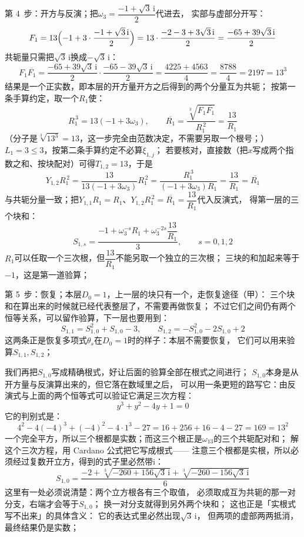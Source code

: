 \documentclass[UTF8,a4paper,11pt]{ctexart}
\newcommand{\ii}{\mathrm{i}}
\begin{document}
第 4~步：开方与反演；把$\omega_3=\dfrac{-1+\sqrt3\,\ii}{2}$代进去，
实部与虚部分开写：
\[
 F_1=13\Bigl(-1+3\cdot\frac{-1+\sqrt3\,\ii}{2}\Bigr)
 =13\cdot\frac{-2-3+3\sqrt3\,\ii}{2}
 =\frac{-65+39\sqrt3\,\ii}{2}
\]
共轭量只需把$\sqrt3\,\ii$换成$-\sqrt3\,\ii$：
\[
 F_1\overline{F_1}
 =\frac{-65+39\sqrt3\,\ii}{2}\cdot\frac{-65-39\sqrt3\,\ii}{2}
 =\frac{4225+4563}{4}=\frac{8788}{4}=2197=13^3
\]
结果是一个正实数，即本层的开方量开方之后得到的两个分量互为共轭；
按第一条手算约定，取一个$R_1$使：
\[
 R_1^{\,3}=13(-1+3\omega_3),\qquad
 \overline{R_1}=\frac{\sqrt[3]{F_1\overline{F_1}}}{R_1^{\,2}}
 =\frac{13}{R_1}
\]
（分子是$\sqrt[3]{13^3}=13$，这一步完全由范数决定，不需要另取一个根号；）
$L_1=3\le3$，按第二条手算约定不必算$\xi_{1,j}$；
若要核对，直接数（把$x$写成两个指数之和、按块配对）可得$T_{1,2}=13$，于是
\[
 Y_{1,2}R_1^{\,2}=\frac{13}{13(-1+3\omega_3)}R_1^{\,2}
 =\frac{R_1^{\,3}}{(-1+3\omega_3)R_1}
 =\frac{13}{R_1}=\overline{R_1}
\]
与共轭分量一致；把$Y_{1,1}R_1=R_1$、$Y_{1,2}R_1^{\,2}=\overline{R_1}=\dfrac{13}{R_1}$代入反演式，
得第一层的三个块和：
\[
 S_{1,s}=\frac{-1+\omega_3^{-s}R_1+\omega_3^{-2s}\dfrac{13}{R_1}}{3},
 \qquad s=0,1,2
\]
$R_1$可以任取一个三次根，但$\dfrac{13}{R_1}$不能另取一个独立的三次根；
三块的和加起来等于$-1$，这是第一道验算；\par

第 5~步：恢复；本层$D_0=1$，上一层的块只有一个，走恢复途径（甲）：
三个块和在算出来的时候就已经代表整层了，不需要再做恢复；
不过它们之间仍有两个恒等关系，可以留作验算，下一层也要用到：
\[
 S_{1,1}=S_{1,0}^2+S_{1,0}-3,\qquad S_{1,2}=-S_{1,0}^2-2S_{1,0}+2
\]
这两条正是恢复多项式$\theta_s$在$D_0=1$时的样子：本层不需要恢复，
它们可以用来验算$S_{1,1},S_{1,2}$；\par

我们再把$S_{1,0}$写成精确根式，好让后面的验算全部在根式之间进行；
$S_{1,0}$本身是从开方量与反演算出来的，但它落在数域里之后，
可以用一条更短的路写它：由反演式与上面的两个恒等式可以验证它满足三次方程：
\[
 y^3+y^2-4y+1=0
\]
它的判别式是：
\[
 4^2-4(-4)^3+(-4)^2-4\cdot1^3-27=16+256+16-4-27=169=13^2
\]
一个完全平方，所以三个根都是实数；而这三个根正是$\omega_{13}$的三个共轭配对和；
解这个三次方程，用 Cardano 公式把它写成根式——
注意三个根都是实根，所以必须经过复数开立方，得到的式子里必然带$\ii$：
\[
 S_{1,0}=\frac{-2+\sqrt[3]{-260+156\sqrt3\,\ii}+\sqrt[3]{-260-156\sqrt3\,\ii}}{6}
\]
这里有一处必须说清楚：两个立方根各有三个取值，
必须取成互为共轭的那一对分支，右端才会等于$S_{1,0}$；
换一对分支就得到另外两个块和；
这也正是「实根式写不出来」的具体含义：
它的表达式里必然出现$\sqrt3\,\ii$，
但两项的虚部两两抵消，最终结果仍是实数；\par
\end{document}
